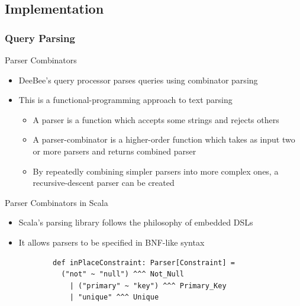 \documentclass{beamer}
\begin{document}
\subsection{Implementation}
\subsubsection{Query Parsing}
\begin{frame}{Parser Combinators}
  \begin{itemize}
  \item DeeBee's query processor parses queries using \alert{combinator parsing}~\citep{moors2008parser,swierstra2001combinator,fokker1995functional,odersky2008programming}  \pause
  \item This is a functional-programming approach to text parsing  \pause
  \begin{itemize}
    \item A \alert{parser} is a function which accepts some strings and rejects others  \pause
    \item A \alert{parser-combinator} is a higher-order function which takes as input two or more parsers and returns combined parser  \pause
    \item By repeatedly combining simpler parsers into more complex ones, a \alert{recursive-descent parser} can be created  \pause
  \end{itemize}
  \end{itemize}
\end{frame}

\begin{frame}[fragile]{Parser Combinators in Scala}
  \begin{itemize}
    \item Scala's parsing library follows the philosophy of \alert{embedded DSLs}~\citep{ghosh2010dsls,hofer2008polymorphic,moors2008parser,odersky2008programming}  \pause
    \item It allows parsers to be specified in \alert{BNF-like} syntax  \pause
    \begin{example}
    \begin{verbatim}
        def inPlaceConstraint: Parser[Constraint] = 
          ("not" ~ "null") ^^^ Not_Null
            | ("primary" ~ "key") ^^^ Primary_Key
            | "unique" ^^^ Unique
    \end{verbatim}
    \end{example}

  \end{itemize}
\end{frame}
\end{document}
